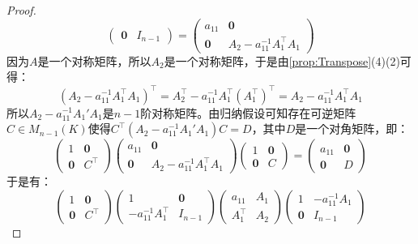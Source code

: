 \begin{proof}
\begin{equation*}
\begin{pmatrix}
			\mathbf{0} & I_{n-1}
		\end{pmatrix}
		=
		\begin{pmatrix}
			a_{11} & \mathbf{0} \\
			\mathbf{0} & A_2-a_{11}^{-1}A_1^{\top}A_1
		\end{pmatrix}
	\end{equation*}
	因为$A$是一个对称矩阵，所以$A_2$是一个对称矩阵，于是由\cref{prop:Transpose}(4)(2)可得：
	\begin{equation*}
		(A_2-a_{11}^{-1}A_1^{\top}A_1)^{\top}=A_2^{\top}-a_{11}^{-1}A_1^{\top}(A_1^{\top})^{\top}=A_2-a_{11}^{-1}A_1^{\top}A_1
	\end{equation*}
	所以$A_2-a_{11}^{-1}A_1'A_1$是$n-1$阶对称矩阵。由归纳假设可知存在可逆矩阵$C\in M_{n-1}(K)$使得$C^{\top}(A_2-a_{11}^{-1}A_1'A_1)C=D$，其中$D$是一个对角矩阵，即：
	\begin{equation*}
		\begin{pmatrix}
			1 & \mathbf{0} \\
			\mathbf{0} & C^{\top}
		\end{pmatrix}
		\begin{pmatrix}
			a_{11} & \mathbf{0} \\
			\mathbf{0} & A_2-a_{11}^{-1}A_1^{\top}A_1
		\end{pmatrix}
		\begin{pmatrix}
		1 & \mathbf{0} \\
		\mathbf{0} & C
		\end{pmatrix}
		=
		\begin{pmatrix}
			a_{11} & \mathbf{0} \\
			\mathbf{0} & D
		\end{pmatrix}
	\end{equation*}
	于是有：
	\begin{equation*}
		\begin{pmatrix}
			1 & \mathbf{0} \\
			\mathbf{0} & C^{\top}
		\end{pmatrix}
		\begin{pmatrix}
			1 & \mathbf{0} \\
			-a_{11}^{-1}A_1^{\top} & I_{n-1}
		\end{pmatrix}
		\begin{pmatrix}
			a_{11} & A_1 \\
			A_1^{\top} & A_2
		\end{pmatrix}
		\begin{pmatrix}
			1 & -a_{11}^{-1}A_1 \\
			\mathbf{0} & I_{n-1}

\end{pmatrix}
\end{equation*}
\end{proof}
